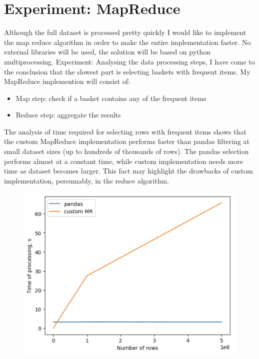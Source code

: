 % 
% 
\chapter{Experiment: MapReduce}
\label{chap:map-reduce}

Although the full dataset is processed pretty quickly I would like to implement the map reduce algorithm in order to make the entire implementation faster.
No external libraries will be used, the solution will be based on python multiprocessing.
Experiment: 
Analysing the data processing steps, I have come to the conclusion that the slowest part is selecting baskets with frequent items. My MapReduce implemention will consist of:

\begin{itemize}
	\item Map step: check if a basket contains any of the frequent items
	\item Reduce step: aggregate the results
\end{itemize}

The analysis of time required for selecting rows with frequent items shows that the custom MapReduce implementation performs faster than pandas filtering at small dataset sizes (up to hundreds of thousands of rows). The pandas selection performs almost at a constant time, while custom implementation needs more time as dataset becomes larger.
This fact may highlight the drawbacks of custom implementation, persumably, in the reduce algorithm.

\begin{figure}[h]
	\includegraphics[width=12cm]{images/6-map_reduce_timings}
\centering
\end{figure}

